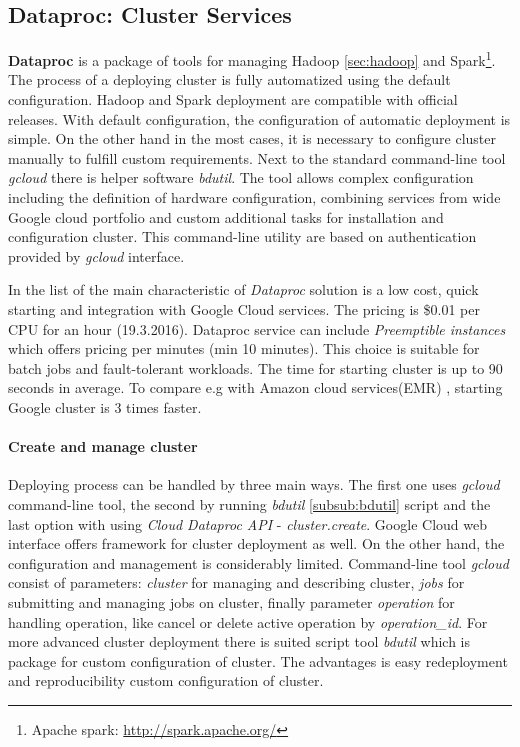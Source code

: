 \documentclass[a4paper,12pt,oneside]{report}
\begin{document}
	
	
	\subsection{Dataproc: Cluster Services}
	\label{subsub:dataproc}
	\textbf{Dataproc} is a package of tools for managing Hadoop \ref{sec:hadoop} 
	and Spark\footnote{Apache spark: \url{http://spark.apache.org/}}.
	The process of a deploying cluster is fully automatized using the default 
	configuration. Hadoop and Spark deployment are compatible with official
	releases. With default configuration, the configuration of automatic deployment is simple. 
	On the other hand in the most cases, it is 
	necessary to configure cluster manually to fulfill custom requirements. 
	Next to the standard command-line tool \textit{gcloud} there is 
	helper software \emph{bdutil}.  The tool  allows complex 
	configuration including the  
	definition of hardware configuration, combining services from wide Google cloud 
	portfolio and custom additional tasks for installation and configuration
	cluster. 
	This command-line utility are based on authentication provided by \textit{gcloud}
	interface.
	
	In the list of the main characteristic of \textit{Dataproc} solution is a 
	low cost, quick starting and integration with Google Cloud services. 
	The pricing is  \$0.01 per CPU for an hour (19.3.2016). Dataproc service can 
	include \textit{Preemptible instances} which offers pricing 
	per minutes (min 10 minutes). This choice is suitable for batch jobs and 
	fault-tolerant workloads. The time for starting cluster is up to 
	90 seconds in average. To compare e.g with Amazon cloud
	services(EMR) \cite{amazon_emr}, starting Google cluster is 3 times faster.
	
	\paragraph{Create and manage cluster} Deploying process can be handled by three
	main ways. The first one uses \textit{gcloud} command-line tool, the second by running
	\textit{bdutil} \ref{subsub:bdutil} script and the last option with using 
	\textit{Cloud Dataproc API} - \textit{cluster.create}. Google Cloud web
	interface offers framework for cluster deployment as well. On the other hand,
	the configuration and management is considerably limited. Command-line tool
	\textit{gcloud} consist of parameters: \textit{cluster} for managing and describing
	cluster, \textit{jobs} for submitting 	and managing jobs on cluster, finally parameter
	\textit{operation} for handling operation, like cancel or delete active 
	operation by \emph{operation\_id}. For more advanced cluster deployment there is	
	suited script tool \textit{bdutil} which is 
	package for custom configuration of cluster. The advantages is easy
	redeployment and	reproducibility custom	configuration of cluster. 
	
\end{document}
